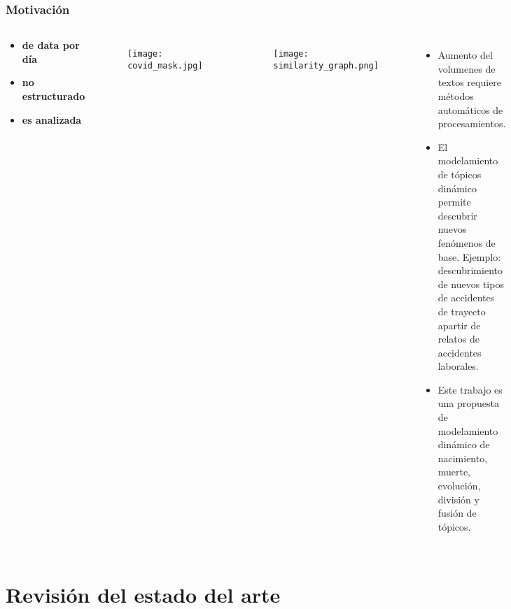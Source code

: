 \documentclass[
	spanish, %
	aspectratio=43, %
	hyperref={pdfencoding=auto,psdextra},
	xcolor={dvipsnames,table,usenames},
]{beamer}
\begin{document}
\begin{frame}[t]
\frametitle{Motivación} 
\begin{columns}[t]
  \begin{center}
    \begin{minipage}{0.8\textwidth}
    \begin{itemize}
    \item[] \textbf{\scalebox{1.5}{\textcolor{royalblue}{2 EB}} de data por día} %
    \item[] \textbf{\scalebox{1.5}{\textcolor{royalblue}{80\%}} no estructurado}
    \item[] \textbf{\scalebox{1.5}{\textcolor{royalblue}{12\%}} es analizada}
    \end{itemize}
    \end{minipage}
   \end{center}
  
  \vspace*{-0.2in}
  \begin{figure}
  \texttt{[image: covid\_mask.jpg]}
  \end{figure}

  \vspace*{-0.4in}
  \begin{figure}
  \texttt{[image: similarity\_graph.png]} 
  \end{figure}

  \begin{itemize}
    \item Aumento del volumenes de textos requiere métodos automáticos de procesamientos. 
    \item El modelamiento de tópicos dinámico permite descubrir nuevos fenómenos de base. Ejemplo: descubrimiento de nuevos tipos de accidentes de trayecto apartir de relatos de accidentes laborales.
    \item Este trabajo es una propuesta de modelamiento dinámico de nacimiento, muerte, evolución, división y fusión de tópicos.
  \end{itemize}
\end{columns}
\end{frame}

\section{Revisión del estado del arte}
\end{document}

